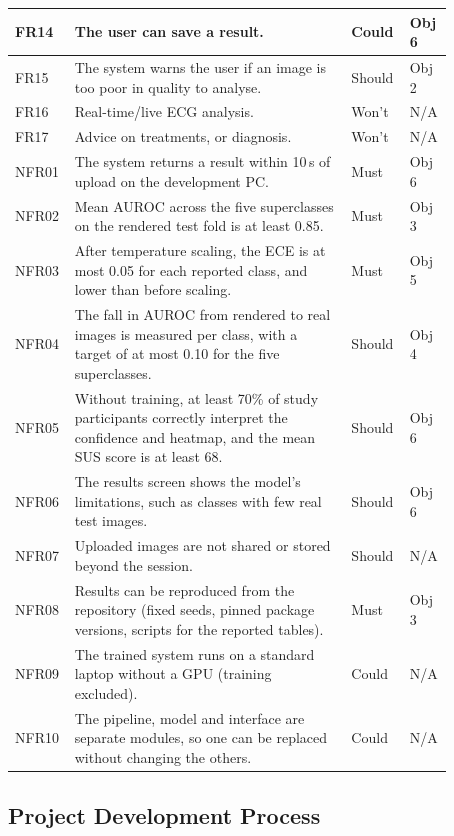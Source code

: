 \documentclass[12pt,nonacm,acmlarge,titlepage,screen]{acmart}
\begin{document}
\begin{longtable}{|P{0.08\linewidth}|P{0.60\linewidth}|P{0.105\linewidth}|P{0.085\linewidth}|}
    \hline
    FR14 & The user can save a result. & Could & Obj 6 \\
    \hline
    FR15 & The system warns the user if an image is too poor in quality to analyse. & Should & Obj 2 \\
    \hline
    FR16 & Real-time/live ECG analysis. & Won't & N/A \\ %
    \hline
    FR17 & Advice on treatments, or diagnosis. & Won't & N/A \\
    \hline
    NFR01 & The system returns a result within 10\,s of upload on the development PC. & Must & Obj 6 \\
    \hline
    NFR02 & Mean AUROC across the five superclasses on the rendered test fold is at least 0.85. & Must & Obj 3 \\
    \hline
    NFR03 & After temperature scaling, the ECE is at most 0.05 for each reported class, and lower than before scaling. & Must & Obj 5 \\
    \hline
    NFR04 & The fall in AUROC from rendered to real images is measured per class, with a target of at most 0.10 for the five superclasses. & Should & Obj 4 \\
    \hline
    NFR05 & Without training, at least 70\% of study participants correctly interpret the confidence and heatmap, and the mean SUS score is at least 68. & Should & Obj 6 \\
    \hline
    NFR06 & The results screen shows the model's limitations, such as classes with few real test images. & Should & Obj 6 \\
    \hline
    NFR07 & Uploaded images are not shared or stored beyond the session. & Should & N/A \\
    \hline
    NFR08 & Results can be reproduced from the repository (fixed seeds, pinned package versions, scripts for the reported tables). & Must & Obj 3 \\
    \hline
    NFR09 & The trained system runs on a standard laptop without a GPU (training excluded). & Could & N/A \\
    \hline
    NFR10 & The pipeline, model and interface are separate modules, so one can be replaced without changing the others. & Could & N/A \\
    \hline
\end{longtable}
\endgroup

\subsection{Project Development Process}
\label{sec:dev-plan}
\end{document}
